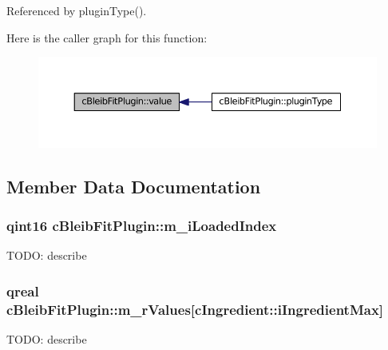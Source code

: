 Referenced by plugin\+Type().



Here is the caller graph for this function\+:
\nopagebreak
\begin{figure}[H]
\begin{center}
\leavevmode
\includegraphics[width=350pt]{classc_bleib_fit_plugin_adb3cc6882c32a04d6d9f31961f0b8dca_icgraph}
\end{center}
\end{figure}




\subsection{Member Data Documentation}
\subsubsection[{\texorpdfstring{m\+\_\+i\+Loaded\+Index}{m_iLoadedIndex}}]{\setlength{\rightskip}{0pt plus 5cm}qint16 c\+Bleib\+Fit\+Plugin\+::m\+\_\+i\+Loaded\+Index\hspace{0.3cm}{\ttfamily [private]}}\hypertarget{classc_bleib_fit_plugin_a381f973f2b98c90e22314a5e1855f3df}{}\label{classc_bleib_fit_plugin_a381f973f2b98c90e22314a5e1855f3df}
T\+O\+DO\+: describe 
\subsubsection[{\texorpdfstring{m\+\_\+r\+Values}{m_rValues}}]{\setlength{\rightskip}{0pt plus 5cm}qreal c\+Bleib\+Fit\+Plugin\+::m\+\_\+r\+Values\mbox{[}{\bf c\+Ingredient\+::i\+Ingredient\+Max}\mbox{]}\hspace{0.3cm}{\ttfamily [private]}}\hypertarget{classc_bleib_fit_plugin_aa9bed63f126286a26ef3b45bfa5fbdcb}{}\label{classc_bleib_fit_plugin_aa9bed63f126286a26ef3b45bfa5fbdcb}
T\+O\+DO\+: describe 
